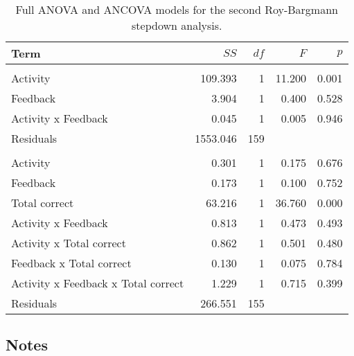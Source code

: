 \documentclass[11pt,]{article}
\begin{document}
\begin{table*}[t]

\caption{\label{tab:rb2Table}Full ANOVA and ANCOVA models for the second Roy-Bargmann
                     stepdown analysis.\label{rb2-table}}
\centering
\begin{tabular}{lrrrr}
\toprule
Term & $SS$ & $df$ & $F$ & $p$\\
\midrule
\addlinespace[0.3em]
\multicolumn{5}{l}{\textbf{ANOVA}}\\
\hspace{1em}Activity & 109.393 & 1 & 11.200 & 0.001\\
\hspace{1em}Feedback & 3.904 & 1 & 0.400 & 0.528\\
\hspace{1em}Activity x Feedback & 0.045 & 1 & 0.005 & 0.946\\
\hspace{1em}Residuals & 1553.046 & 159 &  & \\
\addlinespace[0.3em]
\multicolumn{5}{l}{\textbf{ANCOVA}}\\
\hspace{1em}Activity & 0.301 & 1 & 0.175 & 0.676\\
\hspace{1em}Feedback & 0.173 & 1 & 0.100 & 0.752\\
\hspace{1em}Total correct & 63.216 & 1 & 36.760 & 0.000\\
\hspace{1em}Activity x Feedback & 0.813 & 1 & 0.473 & 0.493\\
\hspace{1em}Activity x Total correct & 0.862 & 1 & 0.501 & 0.480\\
\hspace{1em}Feedback x Total correct & 0.130 & 1 & 0.075 & 0.784\\
\hspace{1em}Activity x Feedback x Total correct & 1.229 & 1 & 0.715 & 0.399\\
\hspace{1em}Residuals & 266.551 & 155 &  & \\
\bottomrule
\end{tabular}
\end{table*}

\hypertarget{notes}{%
\subsection{Notes}\label{notes}}
\end{document}
